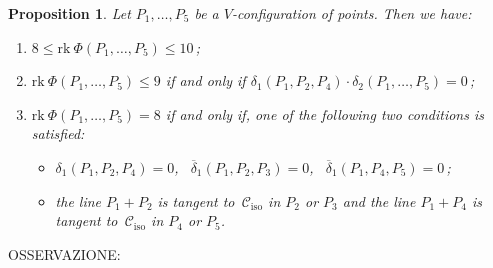 \documentclass[11pt, a4paper, reqno, captions=tableheading,bibliography=totoc]{scrartcl}
\theoremstyle{plain}
\newtheorem{prop}[lemma]{Proposition}
\theoremstyle{definition}
\newcommand{\iso}{\mathcal{C}_{\mathrm{iso}}}
\newcommand{\rk}{\ensuremath{\mathrm{rk}}}
\begin{document}
\begin{prop}
\label{proposition:rank_V}
Let $P_1, \dots, P_5$ be a $V$-configuration of
points. Then we have:
\begin{enumerate}
\item $8 \leq \rk \ \Phi(P_1, \dots, P_5) \leq 10$\,;
\item $\rk \ \Phi(P_1, \dots, P_5) \leq 9$ if and only if
$\delta_1(P_1, P_2, P_4) \cdot \delta_2(P_1, \dots, P_5) =0$\,;
\item $\rk \ \Phi(P_1, \dots, P_5) = 8$ if and only if, one of
the following two conditions is satisfied:
%
\begin{itemize}
\item $\delta_1(P_1, P_2, P_4) = 0$, \
$\overline{\delta}_1(P_1, P_2, P_3) = 0$,
\ $\overline{\delta}_1(P_1, P_4, P_5) = 0$\,;
  \item the line $P_1+P_2$ is tangent to~$\iso$ in $P_2$ or $P_3$
and the line $P_1+P_4$ is tangent to~$\iso$ in $P_4$ or $P_5$.
\end{itemize}
%
\end{enumerate}
\end{prop}
OSSERVAZIONE:
\end{document}
